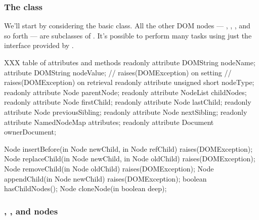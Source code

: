 \documentclass{howto}
\begin{document}
\subsubsection{The  class}

We'll start by considering the basic  class.  All the
other DOM nodes --- , , ,
and so forth --- are subclasses of .  It's possible to
perform many tasks using just the interface provided by .

XXX table of attributes and methods
            readonly attribute  DOMString            nodeName;
                     attribute  DOMString            nodeValue;
                                                           // raises(DOMException) on setting
                                                           // raises(DOMException) on retrieval
            readonly attribute  unsigned short       nodeType;
            readonly attribute  Node                 parentNode;
            readonly attribute  NodeList             childNodes;
            readonly attribute  Node                 firstChild;
            readonly attribute  Node                 lastChild;
            readonly attribute  Node                 previousSibling;
            readonly attribute  Node                 nextSibling;
            readonly attribute  NamedNodeMap         attributes;
            readonly attribute  Document             ownerDocument;

            Node                      insertBefore(in Node newChild,
                                                   in Node refChild)
                                                   raises(DOMException);
            Node                      replaceChild(in Node newChild,
                                                   in Node oldChild)
                                                   raises(DOMException);
            Node                      removeChild(in Node oldChild)
                                                  raises(DOMException);
            Node                      appendChild(in Node newChild)
                                                  raises(DOMException);
            boolean                   hasChildNodes();
            Node                      cloneNode(in boolean deep);


\subsubsection{, , and  nodes}
\end{document}
